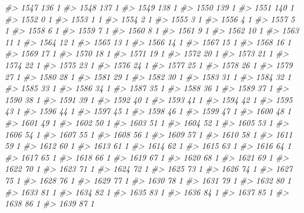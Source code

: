 \documentclass[]{article}
\newenvironment{Shaded}{\begin{snugshade}}{\end{snugshade}}
\newcommand{\CommentTok}[1]{\textcolor[rgb]{0.56,0.35,0.01}{\textit{#1}}}
\begin{document}
\begin{Shaded}
\begin{Highlighting}[]
\CommentTok{#> 1547 136  1}
\CommentTok{#> 1548 137  1}
\CommentTok{#> 1549 138  1}
\CommentTok{#> 1550 139  1}
\CommentTok{#> 1551 140  1}
\CommentTok{#> 1552   0  1}
\CommentTok{#> 1553   1  1}
\CommentTok{#> 1554   2  1}
\CommentTok{#> 1555   3  1}
\CommentTok{#> 1556   4  1}
\CommentTok{#> 1557   5  1}
\CommentTok{#> 1558   6  1}
\CommentTok{#> 1559   7  1}
\CommentTok{#> 1560   8  1}
\CommentTok{#> 1561   9  1}
\CommentTok{#> 1562  10  1}
\CommentTok{#> 1563  11  1}
\CommentTok{#> 1564  12  1}
\CommentTok{#> 1565  13  1}
\CommentTok{#> 1566  14  1}
\CommentTok{#> 1567  15  1}
\CommentTok{#> 1568  16  1}
\CommentTok{#> 1569  17  1}
\CommentTok{#> 1570  18  1}
\CommentTok{#> 1571  19  1}
\CommentTok{#> 1572  20  1}
\CommentTok{#> 1573  21  1}
\CommentTok{#> 1574  22  1}
\CommentTok{#> 1575  23  1}
\CommentTok{#> 1576  24  1}
\CommentTok{#> 1577  25  1}
\CommentTok{#> 1578  26  1}
\CommentTok{#> 1579  27  1}
\CommentTok{#> 1580  28  1}
\CommentTok{#> 1581  29  1}
\CommentTok{#> 1582  30  1}
\CommentTok{#> 1583  31  1}
\CommentTok{#> 1584  32  1}
\CommentTok{#> 1585  33  1}
\CommentTok{#> 1586  34  1}
\CommentTok{#> 1587  35  1}
\CommentTok{#> 1588  36  1}
\CommentTok{#> 1589  37  1}
\CommentTok{#> 1590  38  1}
\CommentTok{#> 1591  39  1}
\CommentTok{#> 1592  40  1}
\CommentTok{#> 1593  41  1}
\CommentTok{#> 1594  42  1}
\CommentTok{#> 1595  43  1}
\CommentTok{#> 1596  44  1}
\CommentTok{#> 1597  45  1}
\CommentTok{#> 1598  46  1}
\CommentTok{#> 1599  47  1}
\CommentTok{#> 1600  48  1}
\CommentTok{#> 1601  49  1}
\CommentTok{#> 1602  50  1}
\CommentTok{#> 1603  51  1}
\CommentTok{#> 1604  52  1}
\CommentTok{#> 1605  53  1}
\CommentTok{#> 1606  54  1}
\CommentTok{#> 1607  55  1}
\CommentTok{#> 1608  56  1}
\CommentTok{#> 1609  57  1}
\CommentTok{#> 1610  58  1}
\CommentTok{#> 1611  59  1}
\CommentTok{#> 1612  60  1}
\CommentTok{#> 1613  61  1}
\CommentTok{#> 1614  62  1}
\CommentTok{#> 1615  63  1}
\CommentTok{#> 1616  64  1}
\CommentTok{#> 1617  65  1}
\CommentTok{#> 1618  66  1}
\CommentTok{#> 1619  67  1}
\CommentTok{#> 1620  68  1}
\CommentTok{#> 1621  69  1}
\CommentTok{#> 1622  70  1}
\CommentTok{#> 1623  71  1}
\CommentTok{#> 1624  72  1}
\CommentTok{#> 1625  73  1}
\CommentTok{#> 1626  74  1}
\CommentTok{#> 1627  75  1}
\CommentTok{#> 1628  76  1}
\CommentTok{#> 1629  77  1}
\CommentTok{#> 1630  78  1}
\CommentTok{#> 1631  79  1}
\CommentTok{#> 1632  80  1}
\CommentTok{#> 1633  81  1}
\CommentTok{#> 1634  82  1}
\CommentTok{#> 1635  83  1}
\CommentTok{#> 1636  84  1}
\CommentTok{#> 1637  85  1}
\CommentTok{#> 1638  86  1}
\CommentTok{#> 1639  87  1}

\end{Highlighting}
\end{Shaded}
\end{document}

